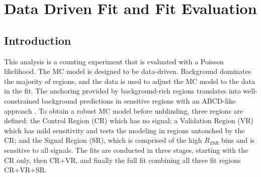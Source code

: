 \setcounter{secnumdepth}{3}
\setcounter{tocdepth}{3}
\setlength{\parskip}{\smallskipamount}
\setlength{\parindent}{0pt}


\makeatletter


\providecommand{\tabularnewline}{\\}


\makeatother

\chapter{Data Driven Fit and Fit Evaluation}

\section{Introduction}
This analysis is a counting experiment that is evaluated with a Poisson likelihood. The MC model is designed to be data-driven. Background dominates the majority of regions, and the data is used to adjust the MC model to the data in the fit. The anchoring provided by background-rich regions translates into well-constrained background predictions in sensitive regions with an ABCD-like approach \cite{abcd}. To obtain a robust MC model before unblinding, three regions are defined: the Control Region (CR) which has no signal; a Validation Region (VR) which has mild sensitivity and tests the modeling in regions untouched by the CR; and the Signal Region (SR), which is comprised of the high $R_{ISR}$ bins and is sensitive to all signals. The fits are conducted in three stages, starting with the CR only, then CR+VR, and finally the full fit combining all three fit regions CR+VR+SR.

